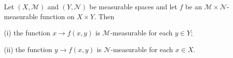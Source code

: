 Let $(X, \mathcal{M})$ and $(Y, \mathcal{N})$ be measurable spaces and let $f$ be an $\mathcal{M} \times \mathcal{N}$-measurable function on $X \times Y$. Then

(i) the function $x \to f(x, y)$ is $\mathcal{M}$-measurable for each $y \in Y$;

(ii) the function $y \to f(x, y)$ is $\mathcal{N}$-measurable for each $x \in X$.
